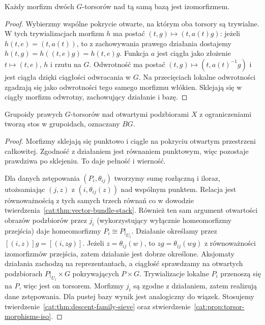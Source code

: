 \begin{stwierdzenie}\label{cat:prop:torsor-morphisms-iso}
Każdy morfizm dwóch $G$-torsorów nad tą samą bazą jest izomorfizmem.
\end{stwierdzenie}
\begin{proof}
Wybierzmy wspólne pokrycie otwarte, na którym oba torsory są trywialne. W tych trywializacjach morfizm $h$ ma postać $(t,g)\mapsto(t,a(t)g)$: jeżeli $h(t,e)=(t,a(t))$, to z zachowywania prawego działania dostajemy $h(t,g)=h((t,e)g)=h(t,e)g$. Funkcja $a$ jest ciągła jako złożenie $t\mapsto(t,e)$, $h$ i rzutu na $G$. Odwrotność ma postać $(t,g)\mapsto(t,a(t)^{-1}g)$ i jest ciągła dzięki ciągłości odwracania w $G$. Na przecięciach lokalne odwrotności zgadzają się jako odwrotności tego samego morfizmu włókien. Sklejają się w ciągły morfizm odwrotny, zachowujący działanie i bazę.
\end{proof}

\begin{twierdzenie}\label{cat:thm:torsor-stack}
Grupoidy prawych $G$-torsorów nad otwartymi podzbiorami $X$ z ograniczeniami tworzą stos w grupoidach, oznaczany $BG$.
\end{twierdzenie}
\begin{proof}
Morfizmy sklejają się punktowo i ciągle na pokryciu otwartym przestrzeni całkowitej. Zgodność z działaniem jest równaniem punktowym, więc pozostaje prawdziwa po sklejeniu. To daje pełność i wierność.

Dla danych zstępowania $(P_i,\theta_{ij})$ tworzymy sumę rozłączną i iloraz, utożsamiając $(j,z)$ z $(i,\theta_{ij}(z))$ nad wspólnym punktem. Relacja jest równoważnością z tych samych trzech równań co w dowodzie twierdzenia~\ref{cat:thm:vector-bundle-stack}. Również ten sam argument otwartości obrazów podzbiorów przez $j_i$ (wykorzystujący wyłącznie homeomorfizmy przejścia) daje homeomorfizmy $P_i\cong P|_{U_i}$. Działanie określamy przez $[(i,z)]g=[(i,zg)]$. Jeżeli $z=\theta_{ij}(w)$, to $zg=\theta_{ij}(wg)$ z równoważności izomorfizmów przejścia, zatem działanie jest dobrze określone. Aksjomaty działania zachodzą na reprezentantach, a ciągłość sprawdzamy na otwartych podzbiorach $P|_{U_i}\times G$ pokrywających $P\times G$. Trywializacje lokalne $P_i$ przenoszą się na $P$, więc jest on torsorem. Morfizmy $j_i$ są zgodne z działaniem, zatem realizują dane zstępowania. Dla pustej bazy wynik jest analogiczny do wiązek. Stosujemy twierdzenie~\ref{cat:thm:descent-family-sieve} oraz stwierdzenie~\ref{cat:prop:torsor-morphisms-iso}.
\end{proof}

